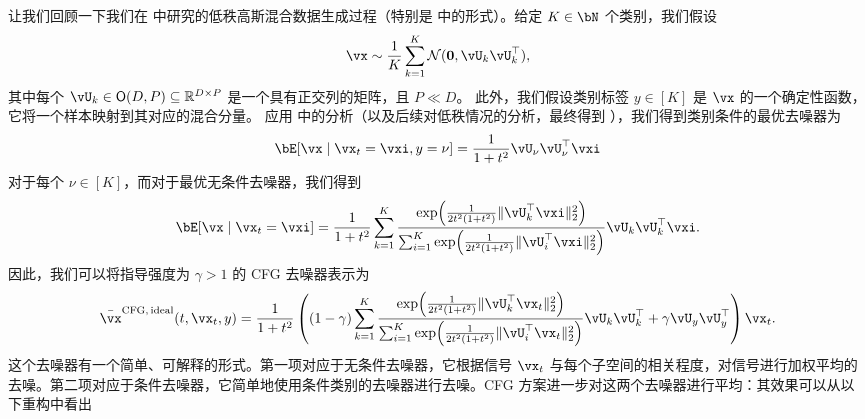 \documentclass[../../book-main_zh.tex]{subfiles}
\begin{document}
\begin{example}\label{example:denoising-gaussian-mixture-cfg}
  让我们回顾一下我们在  中研究的低秩高斯混合数据生成过程（特别是  中的形式）。给定 $K \in \bN$ 个类别，我们假设
  \begin{equation}\label{eq:MoG1-ch6}
    \vx \sim \frac{1}{K}\sum_{k = 1}^{K}\dNorm(\vzero, \vU_{k}\vU_{k}^{\top}),
  \end{equation}
  其中每个 \(\vU_{k} \in \O(D, P) \subseteq \R^{D \times P}\) 是一个具有正交列的矩阵，且 $P \ll D$。
  此外，我们假设类别标签 $y \in [K]$ 是 $\vx$ 的一个确定性函数，它将一个样本映射到其对应的混合分量。
  应用  中的分析（以及后续对低秩情况的分析，最终得到 ），我们得到类别条件的最优去噪器为
  \begin{equation}\label{eq:gmm_lowrank_denoiser-ch6-classcond}
    \bE[ \vx \mid \vx_t = \vxi, y = \nu ]
    = \frac{1}{1 + t^{2}}
    \vU_{\nu}\vU_{\nu}^{\top}\vxi
  \end{equation}
  对于每个 $\nu \in [K]$，而对于最优无条件去噪器，我们得到
  \begin{equation}\label{eq:gmm_lowrank_denoiser-ch6-uncond}
    \bE[ \vx \mid \vx_t = \vxi ]
    = \frac{1}{1 + t^{2}}\sum_{k = 1}^{K}\frac{\exp\rp{\frac{1}{2t^{2}(1 + t^{2})}\norm{\vU_{k}^{\top}\vxi}_{2}^{2}}}{\sum_{i = 1}^{K}\exp\rp{\frac{1}{2t^{2}(1 + t^{2})}\norm{\vU_{i}^{\top}\vxi}_{2}^{2}}}\vU_{k}\vU_{k}^{\top}\vxi.
  \end{equation}
  因此，我们可以将指导强度为 $\gamma > 1$ 的 CFG 去噪器表示为
  \begin{equation}\label{eq:cfg-denoiser-mog-low-rank}
    \bar{\vx}^{\mathrm{CFG,\,ideal}}(t, \vx_t, y)
    =
    \frac{1}{1 + t^{2}}
    \left(
    (1 - \gamma) 
    \sum_{k = 1}^{K}\frac{\exp\rp{\frac{1}{2t^{2}(1
    + t^{2})}\norm{\vU_{k}^{\top}\vx_t}_{2}^{2}}}{\sum_{i
    = 1}^{K}\exp\rp{\frac{1}{2t^{2}(1
    + t^{2})}\norm{\vU_{i}^{\top}\vx_t}_{2}^{2}}}\vU_{k}\vU_{k}^{\top}
    +
    \gamma 
    \vU_{y}\vU_{y}^{\top}
    \right)
    \vx_t.
  \end{equation}
  这个去噪器有一个简单、可解释的形式。第一项对应于无条件去噪器，它根据信号 $\vx_t$ 与每个子空间的相关程度，对信号进行加权平均的去噪。第二项对应于条件去噪器，它简单地使用条件类别的去噪器进行去噪。CFG 方案进一步对这两个去噪器进行平均：其效果可以从以下重构中看出
  \begin{equation}\label{eq:cfg-denoiser-mog-low-rank-2}

\end{equation}
\end{example}
\end{document}
